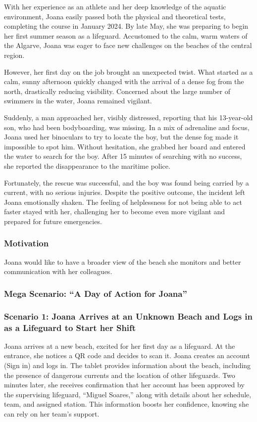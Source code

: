 With her experience as an athlete and her deep knowledge of the aquatic environment, Joana easily passed both the physical and theoretical tests, completing the course in January 2024. By late May, she was preparing to begin her first summer season as a lifeguard. Accustomed to the calm, warm waters of the Algarve, Joana was eager to face new challenges on the beaches of the central region.

However, her first day on the job brought an unexpected twist. What started as a calm, sunny afternoon quickly changed with the arrival of a dense fog from the north, drastically reducing visibility. Concerned about the large number of swimmers in the water, Joana remained vigilant.

Suddenly, a man approached her, visibly distressed, reporting that his 13-year-old son, who had been bodyboarding, was missing. In a mix of adrenaline and focus, Joana used her binoculars to try to locate the boy, but the dense fog made it impossible to spot him. Without hesitation, she grabbed her board and entered the water to search for the boy. After 15 minutes of searching with no success, she reported the disappearance to the maritime police.

Fortunately, the rescue was successful, and the boy was found being carried by a current, with no serious injuries. Despite the positive outcome, the incident left Joana emotionally shaken. The feeling of helplessness for not being able to act faster stayed with her, challenging her to become even more vigilant and prepared for future emergencies.

\subsubsection{\textbf{Motivation}}
Joana would like to have a broader view of the beach she monitors and better communication with her colleagues.

\subsubsection{\textbf{Mega Scenario: ``A Day of Action for Joana''}}
\subsubsection{\textbf{Scenario 1:} Joana Arrives at an Unknown Beach and Logs in as a Lifeguard to Start her Shift}
Joana arrives at a new beach, excited for her first day as a lifeguard. At the entrance, she notices a QR code and decides to scan it. Joana creates an account (Sign in) and logs in. The tablet provides information about the beach, including the presence of dangerous currents and the location of other lifeguards. Two minutes later, she receives confirmation that her account has been approved by the supervising lifeguard, ``Miguel Soares,'' along with details about her schedule, team, and assigned station. This information boosts her confidence, knowing she can rely on her team's support.
